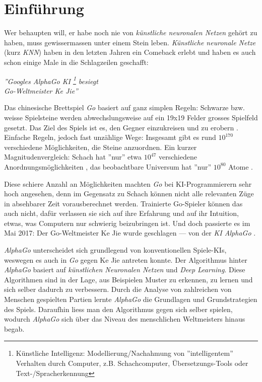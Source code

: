 \section{Einführung}

Wer behaupten will, er habe noch nie von \textit{künstliche neuronalen Netzen} gehört zu haben, muss gewissermassen unter einem Stein leben. \textit{Künstliche neuronale Netze} (kurz \textit{KNN}) haben in den letzten Jahren ein Comeback erlebt und haben es auch schon einige Male in die Schlagzeilen geschafft:
\vspace{0.5cm}

\begin{center}
	{\LARGE \textit{''Googles AlphaGo KI \footnote{Künstliche Intelligenz: Modellierung/Nachahmung von ''intelligentem'' Verhalten durch Computer, z.B. Schachcomputer, Übersetzungs-Tools oder Text-/Spracherkennung} besiegt}\\}
	\vspace{0.5cm}
	{\LARGE \textit{Go-Weltmeister Ke Jie''}}\cite{theverge}
\end{center}

\vspace{0.5cm}


\begin{minipage}{13.5cm}
Das chinesische Brettspiel \textit{Go} basiert auf ganz simplen Regeln: Schwarze bzw. weisse Spielsteine werden abwechslungsweise auf ein 19x19 Felder grosses Spielfeld gesetzt. Das Ziel des Spiels ist es, den Gegner einzukreisen und zu erobern \cite{howtogo}. Einfache Regeln, jedoch fast unzählige Wege: Insgesamt gibt es rund $10^{170}$ verschiedene Möglichkeiten, die Steine anzuordnen. Ein kurzer Magnitudenvergleich: Schach hat ''nur'' etwa $10^{47}$ verschiedene Anordnungsmöglichkeiten \cite{shannon}, das beobachtbare Universum hat ''nur'' $10^{80}$ Atome \cite{atoms}.

Diese schiere Anzahl an Möglichkeiten machten \textit{Go} bei KI-Programmierern sehr hoch angesehen, denn im Gegensatz zu Schach  können nicht alle relevanten Züge in absehbarer Zeit vorausberechnet werden. Trainierte Go-Spieler können das auch nicht, dafür verlassen sie sich auf ihre Erfahrung und auf ihr Intuition, etwas, was Computern nur schwierig beizubringen ist. Und doch passierte es im Mai 2017: Der Go-Weltmeister Ke Jie wurde geschlagen --- von der \textit{KI AlphaGo} \cite{alphago}.
\end{minipage}

\vspace{0.5cm}

\textit{AlphaGo} unterscheidet sich grundlegend von konventionellen Spiele-KIs, weswegen es auch in \textit{Go} gegen Ke Jie antreten konnte. Der Algorithmus hinter \textit{AlphaGo} basiert auf \textit{künstlichen Neuronalen Netzen} und \textit{Deep Learning}. Diese Algorithmen sind in der Lage, aus Beispielen Muster zu erkennen, zu lernen und sich selber dadurch zu verbessern. Durch die Analyse von zahlreichen von Menschen gespielten Partien lernte \textit{AlphaGo} die Grundlagen und Grundstrategien des Spiels. Daraufhin liess man den Algorithmus gegen sich selber spielen, wodurch \textit{AlphaGo} sich über das Niveau des menschlichen Weltmeisters hinaus begab. 

